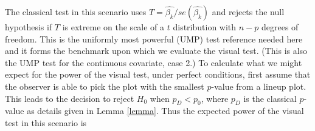\documentclass{article}
\newcommand{\red}[1]{{\color{red} #1}}
\newcommand{\green}[1]{{\color{green} #1}} %
\begin{document}


The classical test in this scenario uses $T= \hat{\beta_k}/ se(\hat{\beta_k})$ and rejects the null hypothesis if $T$ is extreme on the scale of a $t$ distribution with $n-p$ degrees of freedom. This is the uniformly most powerful (UMP) test \green{reference needed here} and it forms the benchmark upon which we evaluate the visual test. (This is also the UMP test for the continuous covariate, case 2.) To calculate what we might expect for the power of the visual test, under perfect conditions, first assume that the observer is able to pick the plot with the smallest $p$-value from a lineup plot.  This leads to the decision to reject $H_0$ when $p_{D} < p_0$, where $p_{D}$ is the classical $p$-value as details given in Lemma \ref{lemma}. Thus the expected power of the visual test in this scenario is
\end{document}
